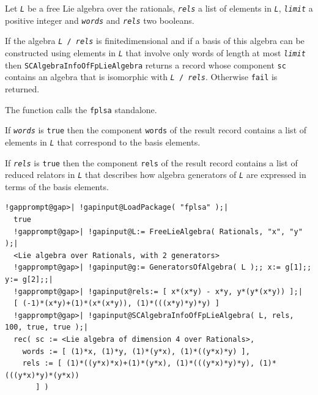 \documentclass[a4paper,11pt]{report}
\begin{document}
{{{ Let \mbox{\texttt{\mdseries\slshape L}} be a free Lie algebra over the rationals, \mbox{\texttt{\mdseries\slshape rels}} a list of elements in \mbox{\texttt{\mdseries\slshape L}}, \mbox{\texttt{\mdseries\slshape limit}} a positive integer and \mbox{\texttt{\mdseries\slshape words}} and \mbox{\texttt{\mdseries\slshape rels}} two booleans. 

 If the algebra \texttt{\mbox{\texttt{\mdseries\slshape L}} / \mbox{\texttt{\mdseries\slshape rels}}} is finite\texttt{}dimensional and if a basis of this algebra can be
constructed using elements in \mbox{\texttt{\mdseries\slshape L}} that involve only words of length at most \mbox{\texttt{\mdseries\slshape limit}} then \texttt{SCAlgebraInfoOfFpLieAlgebra} returns a record whose component \texttt{sc} contains an algebra that is isomorphic with \texttt{\mbox{\texttt{\mdseries\slshape L}} / \mbox{\texttt{\mdseries\slshape rels}}}. Otherwise \texttt{fail} is returned. 

 The function calls the \texttt{fplsa} standalone. 

 If \mbox{\texttt{\mdseries\slshape words}} is \texttt{true} then the component \texttt{words} of the result record contains a list of elements in \mbox{\texttt{\mdseries\slshape L}} that correspond to the basis elements. 

 If \mbox{\texttt{\mdseries\slshape rels}} is \texttt{true} then the component \texttt{rels} of the result record contains a list of reduced relators in \mbox{\texttt{\mdseries\slshape L}} that describes how algebra generators of \mbox{\texttt{\mdseries\slshape L}} are expressed in terms of the basis elements. 

 
\begin{Verbatim}[commandchars=!@|,fontsize=\small,frame=single,label=Example]
  !gapprompt@gap>| !gapinput@LoadPackage( "fplsa" );|
  true
  !gapprompt@gap>| !gapinput@L:= FreeLieAlgebra( Rationals, "x", "y" );|
  <Lie algebra over Rationals, with 2 generators>
  !gapprompt@gap>| !gapinput@g:= GeneratorsOfAlgebra( L );; x:= g[1];; y:= g[2];;|
  !gapprompt@gap>| !gapinput@rels:= [ x*(x*y) - x*y, y*(y*(x*y)) ];|
  [ (-1)*(x*y)+(1)*(x*(x*y)), (1)*(((x*y)*y)*y) ]
  !gapprompt@gap>| !gapinput@SCAlgebraInfoOfFpLieAlgebra( L, rels, 100, true, true );|
  rec( sc := <Lie algebra of dimension 4 over Rationals>, 
    words := [ (1)*x, (1)*y, (1)*(y*x), (1)*((y*x)*y) ], 
    rels := [ (1)*((y*x)*x)+(1)*(y*x), (1)*(((y*x)*y)*y), (1)*(((y*x)*y)*(y*x)) 
       ] )
\end{Verbatim}
 }

}}
\end{document}

